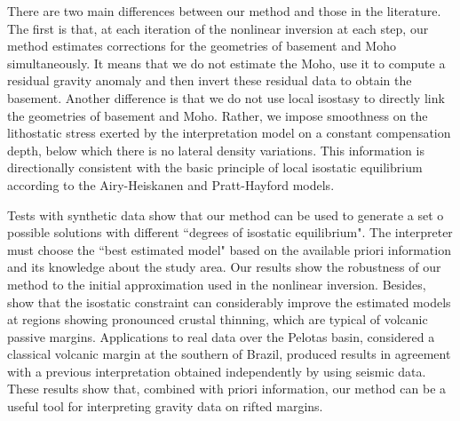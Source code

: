 \documentclass[manuscript]{geophysics}
\begin{document}
There are two main differences between our method and those in the literature.
The first is that, at each iteration of the nonlinear inversion at each step, 
our method estimates corrections for the geometries of basement and Moho simultaneously. 
It means that we do not estimate the Moho, use it to compute a residual gravity anomaly
and then invert these residual data to obtain the basement.
Another difference is that we do not use local isostasy to directly link
the geometries of basement and Moho.
Rather, we impose smoothness on the lithostatic stress exerted by the interpretation 
model on a constant compensation depth, below which there is no lateral density variations.
This information is directionally consistent with the basic principle of 
local isostatic equilibrium according to the Airy-Heiskanen and Pratt-Hayford models.

Tests with synthetic data show that our method can be used to generate a set o possible 
solutions with different ``degrees of isostatic equilibrium". 
The interpreter must choose the ``best estimated model" based on the available priori 
information and its knowledge about the study area.
Our results show the robustness of our method to the initial approximation
used in the nonlinear inversion. Besides, show that 
the isostatic constraint can considerably improve 
the estimated models at regions showing pronounced crustal thinning, which 
are typical of volcanic passive margins. 
Applications to real data over the Pelotas basin, considered a classical volcanic
margin at the southern of Brazil, produced results in agreement with a previous 
interpretation obtained independently by using seismic data.
These results show that, combined with priori information, our method can be a 
useful tool for interpreting gravity data on rifted margins.
\end{document}
